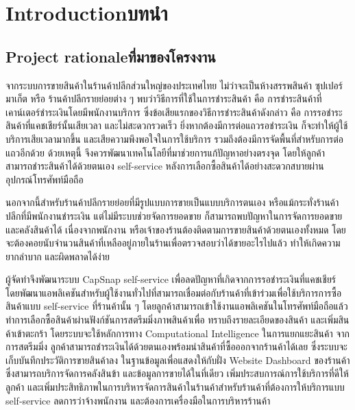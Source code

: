 \chapter{\ifenglish Introduction\else บทนำ\fi}

\section{\ifenglish Project rationale\else ที่มาของโครงงาน\fi}
\par จากระบบการขายสินค้าในร้านค้าปลีกส่วนใหญ่ของประเทศไทย ไม่ว่าจะเป็นห้างสรรพสินค้า ซุปเปอร์มาเก็ต หรือ
ร้านค้าปลีกรายย่อยต่าง ๆ พบว่าวิธีการที่ใช้ในการชำระสินค้า คือ การชำระสินค้าที่เคาน์เตอร์ชำระเงินโดยมีพนักงานบริการ 
ซึ่งข้อเสียแรกของวิธีการชำระสินค้าดังกล่าว คือ การรอชำระสินค้าที่แคชเชียร์นั้นเสียเวลา และไม่สะดวกรวดเร็ว 
ยิ่งหากต้องมีการต่อแถวรอชำระเงิน ก็จะทำให้ผู้ใช้บริการเสียเวลามากขึ้น และเสียความพึงพอใจในการใช้บริการ 
รวมถึงต้องมีการจัดพื้นที่สำหรับการต่อแถวอีกด้วย ด้วยเหตุนี้ จึงควรพัฒนาเทคโนโลยีที่มาช่วยการแก้ปัญหาอย่างตรงจุด 
โดยให้ลูกค้าสามารถชำระสินค้าได้ด้วยตนเอง self-service\enskip
 หลังการเลือกซื้อสินค้าได้อย่างสะดวกสบายผ่านอุปกรณ์โทรศัพท์มือถือ 
\par นอกจากนี้สำหรับร้านค้าปลีกรายย่อยที่มีรูปแบบการขายเป็นแบบบริการตนเอง หรือแม้กระทั่งร้านค้าปลีกที่มีพนักงานชำระเงิน
แต่ไม่มีระบบช่วยจัดการยอดขาย ก็สามารถพบปัญหาในการจัดการยอดขาย และคลังสินค้าได้ เนื่องจากพนักงาน
 หรือเจ้าของร้านต้องติดตามการขายสินค้าด้วยตนเองทั้งหมด โดยจะต้องคอยนับจํานวนสินค้าที่เหลืออยู่ภายในร้านเพื่อตรวจสอบว่าได้ขายอะไรไปแล้ว
  ทำให้เกิดความยากลำบาก และผิดพลาดได้ง่าย 
\par ผู้จัดทําจึงพัฒนาระบบ CapSnap self-service เพื่อลดปัญหาที่เกิดจากการรอชำระเงินที่แคชเชียร์ 
โดยพัฒนาแอพลิเคชันสำหรับผู้ใช้งานทั่วไปที่สามารถเชื่อมต่อกับร้านค้าที่เข้าร่วมเพื่อใช้บริการการซื้อสินค้าแบบ self-service 
ที่ร้านค้านั้น ๆ โดยลูกค้าสามารถเข้าใช้งานแอพลิเคชันในโทรศัพท์มือถือแล้วทำการเลือกซื้อสินค้าผ่านฟังก์ชันการสตรีมมิ่งภาพสินค้าเพื่อ
ทราบถึงรายละเอียดของสินค้า และเพิ่มสินค้าเข้าตะกร้า โดยระบบจะใช้หลักการทาง Computational Intelligence ในการแยกแยะสินค้า
จากการสตรีมมิ่ง ลูกค้าสามารถชำระเงินได้ด้วยตนเองพร้อมนำสินค้าที่ซื้อออกจากร้านค้าได้เลย ซึ่งระบบจะเก็บบันทึกประวัติการขายสินค้าลง
ในฐานข้อมูลเพื่อแสดงให้กับฝั่ง Website Dashboard ของร้านค้าซึ่งสามารถบริการจัดการคลังสินข้า และข้อมูลการขายได้ในที่เดียว 
เพิ่มประสบการณ์การใช้บริการที่ดีให้ลูกค้า และเพิ่มประสิทธิภาพในการบริหารจัดการสินค้าในร้านค้าสำหรับร้านค้าที่ต้องการให้บริการแบบ
 self-service ลดการว่าจ้างพนักงาน และต้องการเครื่องมือในการบริหารร้านค้า 
 


